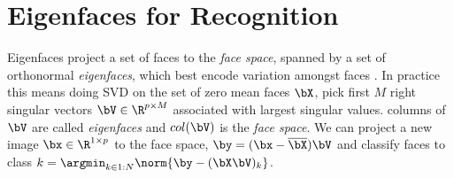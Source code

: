 \documentclass[11pt]{article}
\begin{document}
\section{Eigenfaces for Recognition}

Eigenfaces project a set of faces to the \textit{face space}, spanned by a set of orthonormal \textit{eigenfaces}, which best encode variation amongst faces \cite{pentlandFaceRecognitionUsing1991,turkEigenfacesRecognition1991,junzhangFaceRecognitionEigenface1997}. In practice this means doing SVD on the set of zero mean faces $\bX$, pick first $M$ right singular vectors $\bV\in\R^{p\times M}$ associated with largest singular values. columns of $\bV$ are called \textit{eigenfaces} and $col(\bV)$ is the \textit{face space}. We can project a new image $\bx \in \R^{1\times p}$ to the face space, $\by = (\bx-\overline{\bX})\bV$ and classify faces to class $k = \argmin_{k\in 1:N} \norm{ \by - (\bX\bV)_k }$.


\newpage
\printbibliography 
\end{document}

